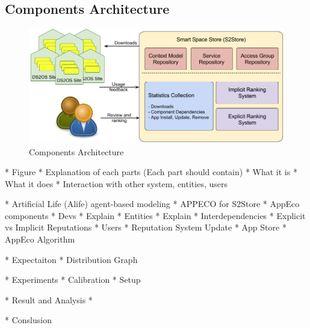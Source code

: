 \subsection{Components Architecture}

\begin{figure}[!htb]
  \centering
  \includegraphics[width=15cm]{figures/components_architecture.png}
  \caption{Components Architecture}
  \label{fig:components-architecture}
\end{figure}

  * Figure
  * Explanation of each parts (Each part should contain)
    * What it is
    * What it does
    * Interaction with other system, entities, users

* Artificial Life (Alife) agent-based modeling
  * APPECO for S2Store
  * AppEco components
  * Devs
    * Explain
  * Entities
    * Explain
    * Interdependencies
    * Explicit vs Implicit Reputations
  * Users
  * Reputation System Update
  * App Store
  * AppEco Algorithm

* Expectaiton
  * Distribution Graph

* Experiments
  * Calibration
  * Setup

* Result and Analysis
  *

* Conslusion
